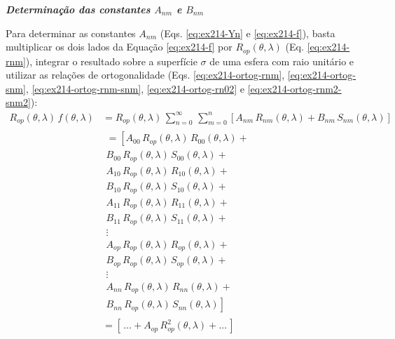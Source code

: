 \documentclass[10pt,a4paper,fleqn]{article}
\begin{document}
\bigskip
\bigskip

\begin{flushleft}
\emph{\textbf{Determinaç\~{a}o das constantes $A_{nm}$ e $B_{nm}$}}
\end{flushleft}

\bigskip
\bigskip

Para determinar as constantes $A_{nm}$ (Eqs. \ref{eq:ex214-Yn} e \ref{eq:ex214-f}), basta multiplicar os 
dois lados da Equação \ref{eq:ex214-f} por $R_{op}(\theta,\lambda)$ (Eq. \ref{eq:ex214-rnm}), integrar o resultado sobre 
a superf\'{i}cie $\sigma$ de uma esfera com raio unit\'{a}rio e utilizar as relaç\~{o}es de ortogonalidade 
(Eqs. \ref{eq:ex214-ortog-rnm}, \ref{eq:ex214-ortog-snm}, \ref{eq:ex214-ortog-rnm-snm}, \ref{eq:ex214-ortog-rn02} e 
\ref{eq:ex214-ortog-rnm2-snm2}):
\begin{equation}
\begin{split}
R_{op}(\theta,\lambda) \, f(\theta,\lambda)
& = R_{op}(\theta,\lambda) \, \sum_{n=0}^{\infty} \,
\sum_{m=0}^{n} \left[ 
A_{nm} \, R_{nm}(\theta, \lambda) +
B_{nm} \, S_{nm}(\theta, \lambda)
\right] \\
& \begin{array}{r} =
\left[ A_{00} \, R_{op}(\theta,\lambda) \, R_{00}(\theta, \lambda) \right. + \\
B_{00} \, R_{op}(\theta,\lambda) \, S_{00}(\theta, \lambda) + \\
A_{10} \, R_{op}(\theta,\lambda) \, R_{10}(\theta, \lambda) + \\
B_{10} \, R_{op}(\theta,\lambda) \, S_{10}(\theta, \lambda) + \\
A_{11} \, R_{op}(\theta,\lambda) \, R_{11}(\theta, \lambda) + \\
B_{11} \, R_{op}(\theta,\lambda) \, S_{11}(\theta, \lambda) + \\
\vdots \quad \quad \quad \quad \quad \\
A_{op} \, R_{op}(\theta,\lambda) \, R_{op}(\theta, \lambda) + \\
B_{op} \, R_{op}(\theta,\lambda) \, S_{op}(\theta, \lambda) + \\
\vdots \quad \quad \quad \quad \quad \\
A_{nn} \, R_{op}(\theta,\lambda) \, R_{nn}(\theta, \lambda) + \\
\left. B_{nn} \, R_{op}(\theta,\lambda) \, S_{nn}(\theta, \lambda) \right]
\end{array} \\
& = \left[ \, \hdots + A_{op} \, R_{op}^{2}(\theta,\lambda) + \hdots \, \right]
\end{split}
\label{eq:ex214-int-Anm-desenvolv}
\end{equation}
\end{document}

